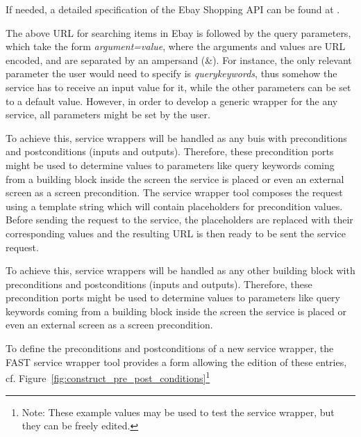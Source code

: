\documentclass{fast_latex}
\begin{document}
If needed, a detailed specification of the Ebay Shopping API can be found at \cite{eBayShoppingAPIs}.

The above URL for searching items in Ebay is followed by the query parameters, which take the form \textit{argument=value}, where the arguments and values are URL encoded, and are separated by an ampersand (\&). For instance, the only relevant parameter the user would need to specify is \emph{querykeywords}, thus somehow the service has to receive an input value for it, while the other parameters can be set to a default value. However, in order to develop a generic wrapper for the any service, all parameters might be set by the user.

To achieve this, service wrappers will be handled as any buis with preconditions and postconditions (inputs and outputs). Therefore, these precondition ports might be used to determine values to parameters like query keywords coming from a building block inside the screen the service is placed or even an external screen as a screen precondition. The service wrapper tool composes the request using a template string which will contain placeholders for precondition values. Before sending the request to the service, the placeholders are replaced with their corresponding values and the resulting URL is then ready to be sent the service request.

To achieve this, service wrappers will be handled as any other building block with preconditions and postconditions (inputs and outputs). Therefore, these precondition ports might be used to determine values to parameters like query keywords coming from a building block inside the screen the service is placed or even an external screen as a screen precondition. 

To define the preconditions and postconditions of a new service wrapper, the FAST service wrapper tool provides a form allowing the edition of these entries, cf. Figure~\ref{fig:construct_pre_post_conditions}\footnote{Note: These example values may be used to test the service wrapper, but they can be freely edited.} 
\end{document}
